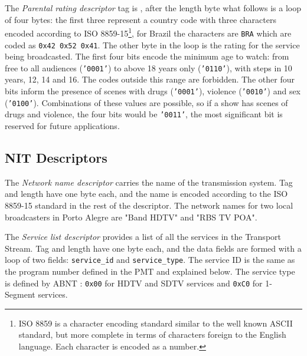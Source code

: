 \documentclass[
	12pt,				%
	openright,			%
	twoside,			%
	a4paper,			%
	brazil,
	french,				%
	english
	]{abntex2}
\begin{document}
The \textit{Parental rating descriptor} tag is \texttt{}, after the length byte what follows is a loop of four bytes: the first three represent a country code with three characters encoded according to ISO 8859-15\footnote{ISO 8859 is a character encoding standard similar to the well known ASCII standard, but more complete in terms of characters foreign to the English language. Each character is encoded as a number.}, for Brazil the characters are \texttt{BRA} which are coded as \texttt{0x42 0x52 0x41}. The other byte in the loop is the rating for the service being broadcasted. The first four bits encode the minimum age to watch: from free to all audiences (\texttt{'0001'}) to above 18 years only (\texttt{'0110'}), with steps in 10 years, 12, 14 and 16. The codes outside this range are forbidden. The other four bits inform the presence of scenes with drugs (\texttt{'0001'}), violence (\texttt{'0010'}) and sex (\texttt{'0100'}). Combinations of these values are possible, so if a show has scenes of drugs and violence, the four bits would be \texttt{'0011'}, the most significant bit is reserved for future applications.

\subsection{NIT Descriptors}
\label{nit_descriptors}
The \textit{Network name descriptor} carries the name of the transmission system. Tag and length have one byte each, and the name is encoded according to the ISO 8859-15 standard in the rest of the descriptor. The network names for two local broadcasters in Porto Alegre are "Band HDTV" and "RBS TV POA".

The \textit{Service list descriptor} provides a list of all the services in the Transport Stream. Tag and length have one byte each, and the data fields are formed with a loop of two fields: \texttt{service\hspace{0.1mm}\_\hspace{0.1mm}id} and \texttt{service\hspace{0.1mm}\_\hspace{0.1mm}type}. The service ID is the same as the program number defined in the PMT and explained below. The service type is defined by ABNT : \texttt{0x00} for HDTV and SDTV services and \texttt{0xC0} for 1-Segment services.
\end{document}

